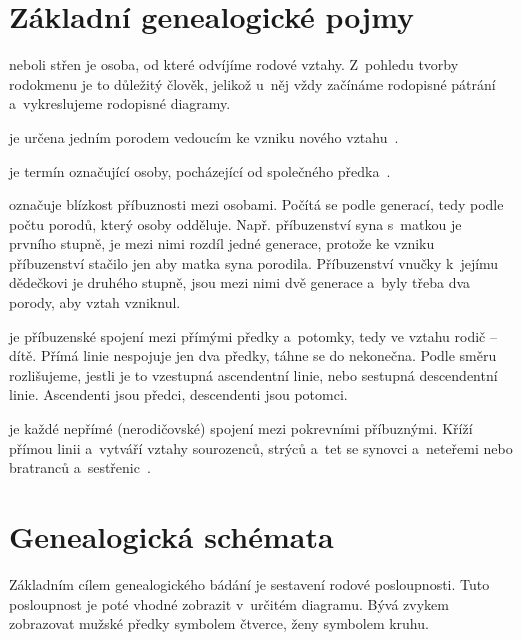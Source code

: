 	\section*{Základní genealogické pojmy}
	\begin{description}[align=left] %
		\item [Proband] neboli střen je osoba, od které odvíjíme rodové vztahy. Z~pohledu tvorby rodokmenu je to důležitý člověk, jelikož u~něj vždy začínáme rodopisné pátrání a~vykreslujeme rodopisné diagramy.
		\item [Generace] je určena jedním porodem vedoucím ke vzniku nového vztahu~\cite{bib:GeneRodoPojmy}. 
		\item [Pokrevenství] je termín označující osoby, pocházející od společného předka~\cite{bib:GeneVade}.
		\item [Stupeň pokrevenství] označuje blízkost příbuznosti mezi osobami. Počítá se podle generací, tedy podle počtu porodů, který osoby odděluje. Např. příbuzenství syna s~matkou je prvního stupně, je mezi nimi rozdíl jedné generace, protože ke vzniku příbuzenství stačilo jen aby matka syna porodila. Příbuzenství vnučky k~jejímu dědečkovi je druhého stupně, jsou mezi nimi dvě generace a~byly třeba dva porody, aby vztah vzniknul.
		\item [Přímá linie] je příbuzenské spojení mezi přímými předky a~potomky, tedy ve vztahu rodič – dítě. Přímá linie nespojuje jen dva předky, táhne se do nekonečna. Podle směru rozlišujeme, jestli je to vzestupná ascendentní linie, nebo sestupná descendentní linie. Ascendenti jsou předci, descendenti jsou potomci.
		\item [Pobočná linie] je každé nepřímé (nerodičovské) spojení mezi pokrevními příbuznými. Kříží přímou linii a~vytváří vztahy sourozenců, strýců a~tet se synovci a~neteřemi nebo bratranců a~sestřenic~\cite{bib:GeneRodoPojmy}.
	\end{description}

	\section*{Genealogická schémata}
	Základním cílem genealogického bádání je sestavení rodové posloupnosti. Tuto posloupnost je poté vhodné zobrazit v~určitém diagramu. Bývá zvykem zobrazovat mužské předky symbolem čtverce, ženy symbolem kruhu.
